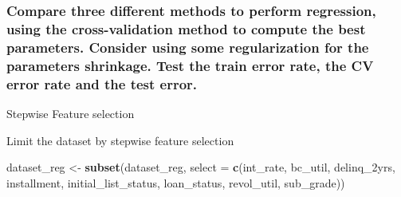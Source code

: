 \documentclass[]{article}
\newenvironment{Shaded}{\begin{snugshade}}{\end{snugshade}}
\newcommand{\CommentTok}[1]{\textcolor[rgb]{0.56,0.35,0.01}{\textit{#1}}}
\newcommand{\ControlFlowTok}[1]{\textcolor[rgb]{0.13,0.29,0.53}{\textbf{#1}}}
\newcommand{\DataTypeTok}[1]{\textcolor[rgb]{0.13,0.29,0.53}{#1}}
\newcommand{\KeywordTok}[1]{\textcolor[rgb]{0.13,0.29,0.53}{\textbf{#1}}}
\newcommand{\NormalTok}[1]{#1}
\newcommand{\OperatorTok}[1]{\textcolor[rgb]{0.81,0.36,0.00}{\textbf{#1}}}
\newcommand{\StringTok}[1]{\textcolor[rgb]{0.31,0.60,0.02}{#1}}
\begin{document}
\hypertarget{compare-three-different-methods-to-perform-regression-using-the-cross-validation-method-to-compute-the-best-parameters.-consider-using-some-regularization-for-the-parameters-shrinkage.-test-the-train-error-rate-the-cv-error-rate-and-the-test-error.}{%
\subsubsection{Compare three different methods to perform regression,
using the cross-validation method to compute the best parameters.
Consider using some regularization for the parameters shrinkage. Test
the train error rate, the CV error rate and the test
error.}\label{compare-three-different-methods-to-perform-regression-using-the-cross-validation-method-to-compute-the-best-parameters.-consider-using-some-regularization-for-the-parameters-shrinkage.-test-the-train-error-rate-the-cv-error-rate-and-the-test-error.}}

Stepwise Feature selection

\begin{Shaded}
\end{Shaded}

Limit the dataset by stepwise feature selection

\begin{Shaded}
\begin{Highlighting}[]
\NormalTok{dataset_reg <-}\StringTok{ }\KeywordTok{subset}\NormalTok{(dataset_reg, }\DataTypeTok{select =} \KeywordTok{c}\NormalTok{(int_rate, bc_util, delinq_2yrs, installment, initial_list_status, loan_status, revol_util, sub_grade))}
\end{Highlighting}
\end{Shaded}
\end{document}
